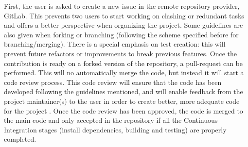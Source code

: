 First, the user is asked to create a new issue in the remote repository
provider, GitLab. This prevents two users to start working on clashing or
redundant tasks and offers a better perspective when organizing the project.
Some guidelines are also given when forking or branching (following the scheme
specified before for branching/merging). There is a special emphasis on test
creation: this will prevent future refactors or improvements to break previous
features. Once the contribution is ready on a forked version of the repository,
a pull-request can be performed. This will no automatically merge the code, but
instead it will start a code review process. This code review will ensure that
the code has been developed following the guidelines mentioned, and will enable
feedback from the project maintainer(s) to the user in order to create better,
more adequate code for the project \cite{beller-2014-review}. Once the code
review has been approved, the code is merged to the main code and only accepted
in the repository if all the Continuous Integration stages (install
dependencies, building and testing) are properly completed.\\

\newpage

